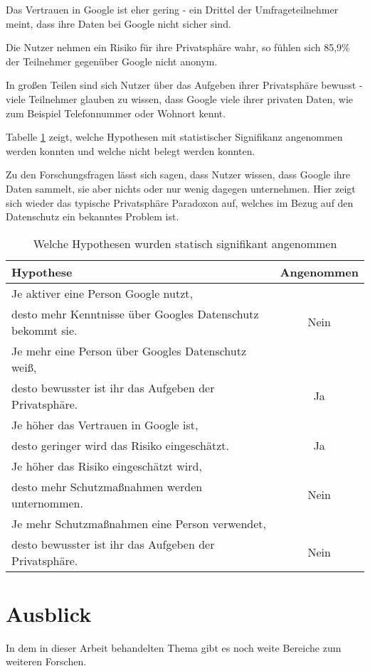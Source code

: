 Das Vertrauen in Google ist eher gering - ein Drittel der Umfrageteilnehmer meint, dass ihre Daten bei Google nicht sicher sind.

Die Nutzer nehmen ein Risiko für ihre Privatsphäre wahr, so fühlen sich 85,9\% der Teilnehmer gegenüber Google nicht anonym.

In großen Teilen sind sich Nutzer über das Aufgeben ihrer Privatsphäre bewusst - viele Teilnehmer glauben zu wissen, dass Google viele ihrer privaten Daten, wie zum Beispiel Telefonnummer oder Wohnort kennt.

Tabelle \ref{hypothesenangenommen} zeigt, welche Hypothesen mit statistischer Signifikanz angenommen werden konnten und welche nicht belegt werden konnten.

Zu den Forschungsfragen lässt sich sagen, dass Nutzer wissen, dass Google ihre Daten sammelt, sie aber nichts oder nur wenig dagegen unternehmen. Hier zeigt sich wieder das typische Privatsphäre Paradoxon auf, welches im Bezug auf den Datenschutz ein bekanntes Problem ist.

\begin{table}
	\begin{tabular}[]{l | c }
	Hypothese & Angenommen\\\hline\hline
	Je aktiver eine Person Google nutzt,\\ desto mehr Kenntnisse über Googles Datenschutz bekommt sie. & Nein\\ \hline
	Je mehr eine Person über Googles Datenschutz weiß,\\ desto bewusster ist ihr das Aufgeben der Privatsphäre. & Ja\\ \hline
	Je höher das Vertrauen in Google ist,\\ desto geringer wird das Risiko eingeschätzt.&Ja\\\hline
	Je höher das Risiko eingeschätzt wird,\\ desto mehr Schutzmaßnahmen werden unternommen.&Nein\\\hline
	Je mehr Schutzmaßnahmen eine Person verwendet,\\ desto bewusster ist ihr das Aufgeben der Privatsphäre.&Nein\\\hline
	\end{tabular}
	\caption{Welche Hypothesen wurden statisch signifikant angenommen}\label{hypothesenangenommen}
\end{table}

\section{Ausblick}
In dem in dieser Arbeit behandelten Thema gibt es noch weite Bereiche zum weiteren Forschen.

